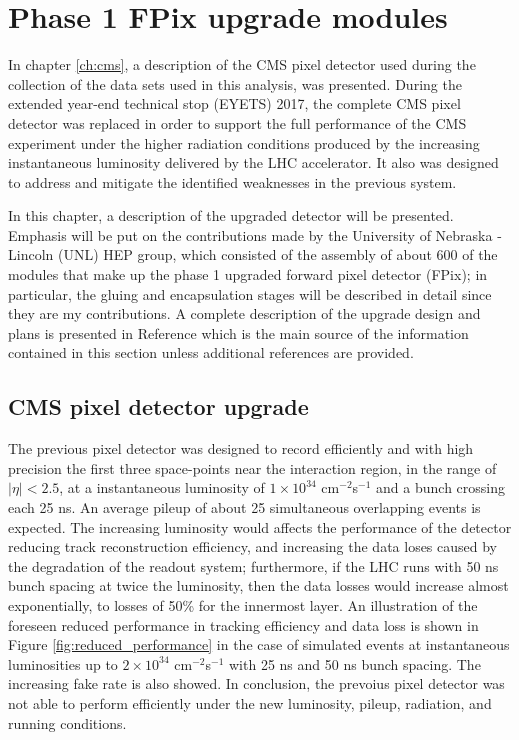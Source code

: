 \chapter{Phase 1 FPix upgrade modules}

In chapter \ref{ch:cms}, a description of the CMS pixel detector used during the collection of the data sets used in this analysis, was presented. During the extended year-end technical stop (EYETS) 2017, the complete CMS pixel detector was replaced in order to support the full performance of the CMS experiment under the higher radiation conditions produced by the increasing instantaneous luminosity delivered  by the LHC accelerator. It also was designed to address and mitigate the identified weaknesses in the previous system.

In this chapter, a description of the upgraded detector will be presented. Emphasis will be put on the contributions made by the University of Nebraska - Lincoln (UNL) HEP group, which consisted of the assembly of about 600 of the modules that make up the phase 1 upgraded forward pixel detector (FPix); in particular, the gluing and encapsulation stages will be described in detail since they are my contributions. A complete description of the upgrade design and plans is presented in Reference \cite{tdr} which is the main source of the information contained in this section unless additional references are provided.   

\section{CMS pixel detector upgrade}

The previous pixel detector was designed to record efficiently and with high precision the first three space-points near the interaction region, in the range of $|\eta|<2.5$,  at a instantaneous luminosity of $1\times10^{34}$ cm$^{-2}$s$^{-1}$ and a bunch crossing each 25 ns. An average pileup of about 25 simultaneous overlapping events is expected. The increasing luminosity would affects the performance of the detector reducing track reconstruction efficiency, and increasing the data loses caused by the degradation of the readout system; furthermore, if the LHC runs with 50 ns bunch spacing at twice the luminosity, then the data losses would increase almost exponentially, to losses of 50\% for the innermost layer. An illustration of the foreseen reduced performance in tracking efficiency and data loss is shown in Figure \ref{fig:reduced_performance} in the case of simulated \ttbar events at instantaneous luminosities up to $2\times10^{34}$ cm$^{-2}$s$^{-1}$ with 25 ns and 50 ns bunch spacing. The increasing fake rate is also showed. In conclusion, the prevoius pixel detector was not able to perform efficiently under the new luminosity, pileup, radiation, and running conditions.  

